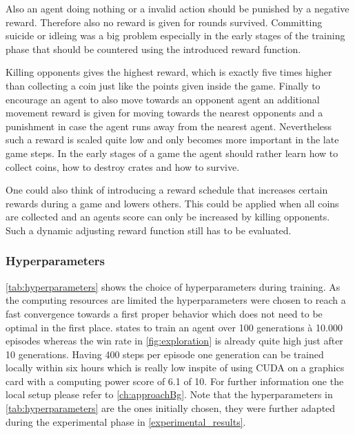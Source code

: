 Also an agent doing nothing or a invalid action should be punished by a negative reward. Therefore also no reward is given for rounds survived. Committing suicide or idleing was a big problem especially in the early stages of the training phase that should be countered using the introduced reward function. 

Killing opponents gives the highest reward, which is exactly five times higher than collecting a coin just like the points given inside the game. Finally to encourage an agent to also move towards an opponent agent an additional movement reward is given for moving towards the nearest opponents and a punishment in case the agent runs away from the nearest agent. Nevertheless such a reward is scaled quite low and only becomes more important in the late game steps. In the early stages of a game the agent should rather learn how to collect coins, how to destroy crates and how to survive. 

One could also think of introducing a reward schedule that increases certain rewards during a game and lowers others. This could be applied when all coins are collected and an agents score can only be increased by killing opponents. Such a dynamic adjusting reward function still has to be evaluated.

\subsubsection{Hyperparameters}
\label{ch:approachBe}

\autoref{tab:hyperparameters} shows the choice of hyperparameters during training. As the computing resources are limited the hyperparameters were chosen to reach a fast convergence towards a first proper behavior which does not need to be optimal in the first place. \cite{Kormelink2018} states to train an agent over 100 generations à 10.000 episodes whereas the win rate in \autoref{fig:exploration} is already quite high just after 10 generations. Having 400 steps per episode one generation can be trained locally within six hours which is really low inspite of using CUDA on a graphics card with a computing power score of 6.1 of 10. For further information one the local setup please refer to \autoref{ch:approachBg}. Note that the hyperparameters in \autoref{tab:hyperparameters} are the ones initially chosen, they were further adapted during the experimental phase in \autoref{experimental_results}.

